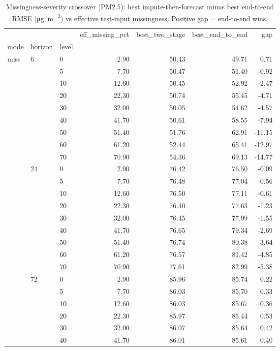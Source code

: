 \begin{table}
\caption{Missingness-severity crossover (PM2.5): best impute-then-forecast minus best end-to-end RMSE (\si{\micro\gram\per\cubic\metre}) vs effective test-input missingness. Positive gap = end-to-end wins.}
\label{tab:crossover}
\begin{tabular}{lllrrrr}
\toprule
 &  &  & eff\_missing\_pct & best\_two\_stage & best\_end\_to\_end & gap \\
mode & horizon & level &  &  &  &  \\
\midrule
\multirow[t]{27}{*}{miss} & \multirow[t]{9}{*}{6} & 0 & 2.90 & 50.43 & 49.71 & 0.71 \\
 &  & 5 & 7.70 & 50.47 & 51.40 & -0.92 \\
 &  & 10 & 12.60 & 50.45 & 52.92 & -2.47 \\
 &  & 20 & 22.30 & 50.74 & 55.45 & -4.71 \\
 &  & 30 & 32.00 & 50.05 & 54.62 & -4.57 \\
 &  & 40 & 41.70 & 50.61 & 58.55 & -7.94 \\
 &  & 50 & 51.40 & 51.76 & 62.91 & -11.15 \\
 &  & 60 & 61.20 & 52.44 & 65.41 & -12.97 \\
 &  & 70 & 70.90 & 54.36 & 69.13 & -14.77 \\
\cline{2-7}
 & \multirow[t]{9}{*}{24} & 0 & 2.90 & 76.42 & 76.50 & -0.09 \\
 &  & 5 & 7.70 & 76.48 & 77.04 & -0.56 \\
 &  & 10 & 12.60 & 76.50 & 77.11 & -0.61 \\
 &  & 20 & 22.30 & 76.40 & 77.63 & -1.23 \\
 &  & 30 & 32.00 & 76.45 & 77.99 & -1.55 \\
 &  & 40 & 41.70 & 76.65 & 79.34 & -2.69 \\
 &  & 50 & 51.40 & 76.74 & 80.38 & -3.64 \\
 &  & 60 & 61.20 & 76.57 & 81.42 & -4.85 \\
 &  & 70 & 70.90 & 77.61 & 82.99 & -5.38 \\
\cline{2-7}
 & \multirow[t]{9}{*}{72} & 0 & 2.90 & 85.96 & 85.74 & 0.22 \\
 &  & 5 & 7.70 & 86.03 & 85.70 & 0.33 \\
 &  & 10 & 12.60 & 86.03 & 85.67 & 0.36 \\
 &  & 20 & 22.30 & 85.97 & 85.44 & 0.53 \\
 &  & 30 & 32.00 & 86.07 & 85.64 & 0.42 \\
 &  & 40 & 41.70 & 86.01 & 85.61 & 0.40 \\

\end{tabular}
\end{table}
